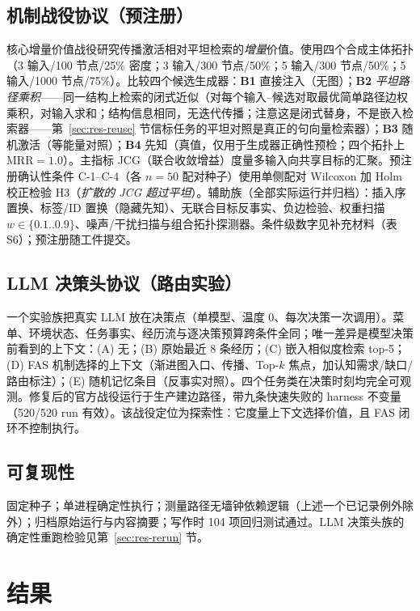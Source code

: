 \documentclass[10pt,a4paper]{ctexart}
\begin{document}
\subsection{机制战役协议（预注册）}
\label{sec:method-civ}
核心增量价值战役研究传播激活相对平坦检索的\emph{增量}价值。使用四个合成主体拓扑（3 输入/100 节点/25\% 密度；3 输入/300 节点/50\%；5 输入/300 节点/50\%；5 输入/1000 节点/75\%）。比较四个候选生成器：\textbf{B1} 直接注入（无图）；\textbf{B2} \emph{平坦路径乘积}——同一结构上检索的闭式近似（对每个输入--候选对取最优简单路径边权乘积，对输入求和；结构信息相同，无迭代传播；注意这是闭式替身，不是嵌入检索器——第~\ref{sec:res-reuse} 节信标任务的平坦对照是真正的句向量检索器）；\textbf{B3} 随机激活（等能量对照）；\textbf{B4} 先知（真值，仅用于生成器正确性预检；四个拓扑上 MRR${=}1.0$）。主指标 JCG（联合收敛增益）度量多输入向共享目标的汇聚。预注册确认性条件 C-1--C-4（各 $n{=}50$ 配对种子）使用单侧配对 Wilcoxon 加 Holm 校正检验 H3（\emph{扩散的 JCG 超过平坦}）。辅助族（全部实际运行并归档）：插入序置换、标签/ID 置换（隐藏先知）、无联合目标反事实、负边检验、权重扫描 $w\in\{0.1..0.9\}$、噪声/干扰扫描与组合拓扑探测器。条件级数字见补充材料（表 S6）；预注册随工件提交。

\subsection{LLM 决策头协议（路由实验）}
\label{sec:method-routing}
一个实验族把真实 LLM 放在决策点（单模型、温度 0、每次决策一次调用）。菜单、环境状态、任务事实、经历流与逐决策预算跨条件全同；唯一差异是模型决策前看到的上下文：(A) 无；(B) 原始最近 8 条经历；(C) 嵌入相似度检索 top-5；(D) FAS 机制选择的上下文（渐进图入口、传播、Top-$k$ 焦点，加认知需求/缺口/路由标注）；(E) 随机记忆条目（反事实对照）。四个任务类在决策时刻均完全可观测。修复后的官方战役运行于生产建边路径，带九条快速失败的 harness 不变量（520/520 run 有效）。该战役定位为探索性：它度量上下文选择价值，且 FAS 闭环不控制执行。

\subsection{可复现性}
固定种子；单进程确定性执行；测量路径无墙钟依赖逻辑（上述一个已记录例外除外）；归档原始运行与内容摘要；写作时 104 项回归测试通过。LLM 决策头族的确定性重跑检验见第~\ref{sec:res-rerun} 节。

\section{结果}
\label{sec:results}
\end{document}
